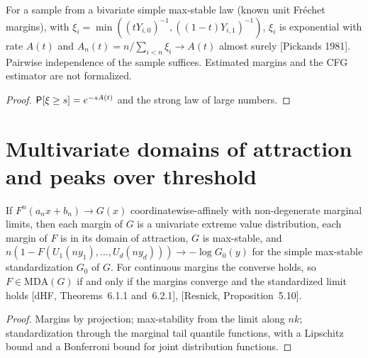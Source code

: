 \begin{theorem}
  \label{thm:pickands-estimator}
  \leanok
  For a sample from a bivariate simple max-stable law (known unit Fr\'echet margins), with
  $\xi_i = \min((t Y_{i,0})^{-1}, ((1-t) Y_{i,1})^{-1})$, $\xi_i$ is exponential with rate $A(t)$ and
  $\hat A_n(t) = n / \sum_{i<n} \xi_i \to A(t)$ almost surely [Pickands 1981]. Pairwise independence of the sample
  suffices. Estimated margins and the CFG estimator are not formalized.
\end{theorem}
\begin{proof}
  \leanok
  $\mathsf{P}[\xi \ge s] = e^{-s A(t)}$ and the strong law of large numbers.
\end{proof}

\section{Multivariate domains of attraction and peaks over threshold}

\begin{theorem}
  \label{thm:multivariate-mda}
  \leanok
  If $F^n(a_n x + b_n) \to G(x)$ coordinatewise-affinely with non-degenerate marginal limits, then each margin of $G$ is a
  univariate extreme value distribution, each margin of $F$ is in its domain of attraction, $G$ is max-stable, and
  $n(1 - F(U_1(n y_1), \dots, U_d(n y_d))) \to -\log G_0(y)$ for the simple max-stable standardization $G_0$ of $G$. For
  continuous margins the converse holds, so $F \in \mathrm{MDA}(G)$ if and only if the margins converge and the standardized
  limit holds [dHF, Theorems~6.1.1 and~6.2.1], [Resnick, Proposition~5.10].
\end{theorem}
\begin{proof}
  \leanok
  Margins by projection; max-stability from the limit along $nk$; standardization through the marginal tail quantile
  functions, with a Lipschitz bound and a Bonferroni bound for joint distribution functions.
\end{proof}

